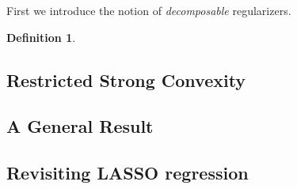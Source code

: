 \documentclass{article}
\newtheorem{definition}{Definition}
\begin{document}
First we introduce the notion of \textit{decomposable} regularizers.

\begin{definition}

\end{definition}


\subsection{Restricted Strong Convexity}

\subsection{A General Result}

\subsection{Revisiting LASSO regression}
\end{document}
